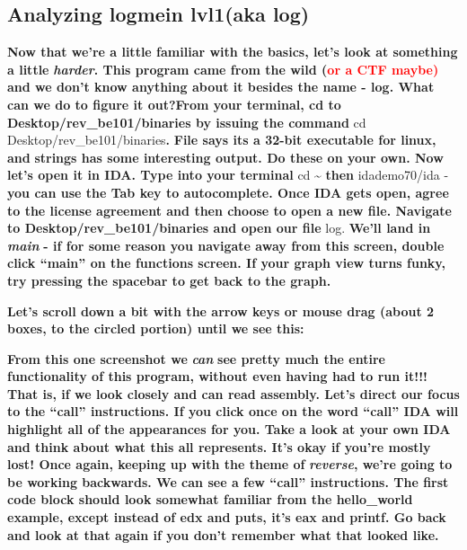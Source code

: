 \documentclass[letterpaper]{article}
\newcommand{\sitfig}[3]{
\begin{figure}[H]
\centering
\makebox[\textwidth][c]{
#2
}
\label{#1}
\end{figure}
}
\newcommand{\sitgfx}[4][scale=1.0]{
\sitfig{#3}{\texttt{[image: \#2]}}{#4}
}
\begin{document}
\subsection{Analyzing logmein lvl1(aka log)}

\textbf{Now that we're a little familiar with the basics, let's look at something a little
}\textbf{\textit{harder}}\textbf{. This program came from the wild (}\textbf{\textcolor{red}{or a CTF maybe)}}\textbf{
and we don't know anything about it besides the name - log. What can we do to figure it out?From your terminal, cd to
Desktop/rev\_be101/binaries by issuing the command }cd Desktop/rev\_be101/binaries\textbf{.
}\textbf{\textcolor[rgb]{0.21960784,0.4627451,0.11372549}{File }}\textbf{says its a 32-bit executable for linux, and
}\textbf{\textcolor[rgb]{0.21960784,0.4627451,0.11372549}{strings }}\textbf{has some interesting output. Do these on
your own. \newline
\newline
Now let's open it in IDA. Type into your terminal }cd \~{} \textbf{then }idademo70/ida -\textbf{you can use the Tab key
to autocomplete. Once IDA gets open, agree to the license agreement and then choose to open a new file. Navigate to
Desktop/rev\_be101/binaries and open our file }log. \textbf{We'll land in }\textbf{\textit{main }}\textbf{ {}- if for
some reason you navigate away from this screen, double click ``main'' on the functions screen. If your graph view turns
funky, try pressing the spacebar to get back to the graph.}  
\sitgfx[width=6.5in,height=3.2638in]{reversing-img012.png}{fig:unk}{TODO CAPTION}
 

\textbf{Let's scroll down a bit with the arrow keys or mouse drag (about 2 boxes, to the circled portion) until we see
this:  }

  
\sitgfx[width=6.5in,height=3.4862in]{reversing-img013.png}{fig:unk}{TODO CAPTION}
 

\textbf{From this one screenshot we }\textbf{\textit{can}}\textbf{ see pretty much the entire functionality of this
program, without even having had to run it!!! That is, if we look closely and can read assembly. Let's direct our focus
to the ``call'' instructions. If you click once on the word ``call'' IDA will highlight all of the appearances for you.
Take a look at your own IDA and think about what this all represents. It's okay if you're mostly lost! Once again,
keeping up with the theme of }\textbf{\textit{reverse}}\textbf{, we're going to be working backwards. \newline
\newline
We can see a few ``call'' instructions. The first code block should look somewhat familiar from the hello\_world
example, except instead of edx and puts, it's eax and printf. Go back and look at that again if you don't remember what
that looked like.}
\end{document}
